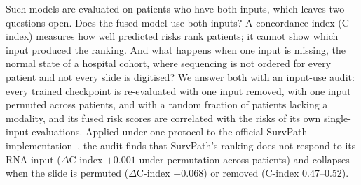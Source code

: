 \documentclass{article}
\newcommand{\cindex}{C-index}
\begin{document}
Such models are evaluated on patients who have both inputs, which leaves two questions open. Does the fused model use both inputs? A concordance index (\cindex{}) measures how well predicted risks rank patients; it cannot show which input produced the ranking. And what happens when one input is missing, the normal state of a hospital cohort, where sequencing is not ordered for every patient and not every slide is digitised? We answer both with an input-use audit: every trained checkpoint is re-evaluated with one input removed, with one input permuted across patients, and with a random fraction of patients lacking a modality, and its fused risk scores are correlated with the risks of its own single-input evaluations. Applied under one protocol to the official SurvPath implementation~\citep{jaume2024survpath}, the audit finds that SurvPath's ranking does not respond to its RNA input ($\Delta$\cindex{} $+0.001$ under permutation across patients) and collapses when the slide is permuted ($\Delta$\cindex{} $-0.068$) or removed (\cindex{} 0.47--0.52).
\end{document}
